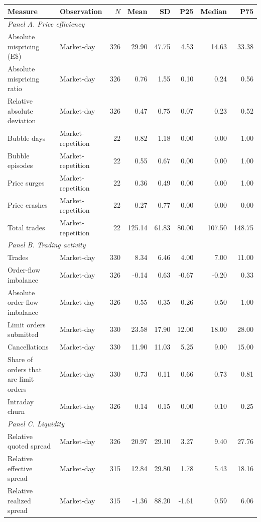 \begin{tabular}{llrrrrrr}
\toprule
Measure & Observation & $N$ & Mean & SD & P25 & Median & P75 \\
\midrule
\multicolumn{8}{l}{\textit{Panel A. Price efficiency}} \\
Absolute mispricing (E\$) & Market-day & 326 & 29.90 & 47.75 & 4.53 & 14.63 & 33.38 \\
Absolute mispricing ratio & Market-day & 326 & 0.76 & 1.55 & 0.10 & 0.24 & 0.56 \\
Relative absolute deviation & Market-day & 326 & 0.47 & 0.75 & 0.07 & 0.23 & 0.52 \\
Bubble days & Market-repetition & 22 & 0.82 & 1.18 & 0.00 & 0.00 & 1.00 \\
Bubble episodes & Market-repetition & 22 & 0.55 & 0.67 & 0.00 & 0.00 & 1.00 \\
Price surges & Market-repetition & 22 & 0.36 & 0.49 & 0.00 & 0.00 & 1.00 \\
Price crashes & Market-repetition & 22 & 0.27 & 0.77 & 0.00 & 0.00 & 0.00 \\
Total trades & Market-repetition & 22 & 125.14 & 61.83 & 80.00 & 107.50 & 148.75 \\
\multicolumn{8}{l}{\textit{Panel B. Trading activity}} \\
Trades & Market-day & 330 & 8.34 & 6.46 & 4.00 & 7.00 & 11.00 \\
Order-flow imbalance & Market-day & 326 & -0.14 & 0.63 & -0.67 & -0.20 & 0.33 \\
Absolute order-flow imbalance & Market-day & 326 & 0.55 & 0.35 & 0.26 & 0.50 & 1.00 \\
Limit orders submitted & Market-day & 330 & 23.58 & 17.90 & 12.00 & 18.00 & 28.00 \\
Cancellations & Market-day & 330 & 11.90 & 11.03 & 5.25 & 9.00 & 15.00 \\
Share of orders that are limit orders & Market-day & 330 & 0.73 & 0.11 & 0.66 & 0.73 & 0.81 \\
Intraday churn & Market-day & 326 & 0.14 & 0.15 & 0.00 & 0.10 & 0.25 \\
\multicolumn{8}{l}{\textit{Panel C. Liquidity}} \\
Relative quoted spread & Market-day & 326 & 20.97 & 29.10 & 3.27 & 9.40 & 27.76 \\
Relative effective spread & Market-day & 315 & 12.84 & 29.80 & 1.78 & 5.43 & 18.16 \\
Relative realized spread & Market-day & 315 & -1.36 & 88.20 & -1.61 & 0.59 & 6.06 \\

\end{tabular}
